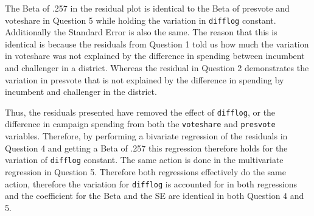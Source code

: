 \documentclass[12pt,letterpaper]{article}
\begin{document}
\begin{enumerate}
		
		The Beta of .257 in the residual plot is identical to the Beta of presvote and voteshare in Question 5 while holding the variation in \texttt{difflog} constant. Additionally the Standard Error is also the same. The reason that this is identical is because the residuals from Question 1  told us how much the variation in voteshare was not explained by the difference in spending between incumbent and challenger in a district. Whereas the residual in Question 2 demonstrates the variation in presvote that is not explained by the difference in spending by incumbent and challenger in the district. 
		
		Thus, the residuals presented have removed the effect of \texttt{difflog}, or the difference in campaign spending from both the \texttt{voteshare} and \texttt{presvote} variables. Therefore, by performing a bivariate regression of the residuals in Question 4 and getting a Beta of .257 this regression therefore holds for the variation of \texttt{difflog} constant. The same action is done in the multivariate regression in Question 5. Therefore both regressions effectively do the same action, therefore the variation for \texttt{difflog} is accounted for in both regressions and the coefficient for the Beta and the SE are identical in both Question 4 and 5.
	
		
		
		
		
	
			\end{enumerate}
\end{document}
